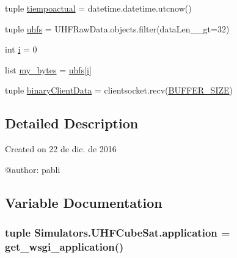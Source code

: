 \begin{DoxyCompactItemize}
\item 
tuple \hyperlink{namespace_simulators_1_1_u_h_f_cube_sat_a7fb0f7569e31bfb48df74cb2df1e8982}{tiempoactual} = datetime.\+datetime.\+utcnow()
\item 
tuple \hyperlink{namespace_simulators_1_1_u_h_f_cube_sat_a37d8eb275fb0a949c06d80bea0726bcf}{uhfs} = U\+H\+F\+Raw\+Data.\+objects.\+filter(data\+Len\+\_\+\+\_\+gt=32)
\item 
int \hyperlink{namespace_simulators_1_1_u_h_f_cube_sat_a58cd206e7df089544d2a4c9ed6e0396b}{i} = 0
\item 
list \hyperlink{namespace_simulators_1_1_u_h_f_cube_sat_a6103aa3fd4ff07b067933dfecee3c073}{my\+\_\+bytes} = \hyperlink{namespace_simulators_1_1_u_h_f_cube_sat_a37d8eb275fb0a949c06d80bea0726bcf}{uhfs}\mbox{[}\hyperlink{namespace_simulators_1_1_u_h_f_cube_sat_a58cd206e7df089544d2a4c9ed6e0396b}{i}\mbox{]}
\item 
tuple \hyperlink{namespace_simulators_1_1_u_h_f_cube_sat_a042020fd8890c418f595709d37cbfa94}{binary\+Client\+Data} = clientsocket.\+recv(\hyperlink{namespace_simulators_1_1_u_h_f_cube_sat_a77fb75361e519e64f660c4da5cca3a8d}{B\+U\+F\+F\+E\+R\+\_\+\+S\+I\+Z\+E})
\end{DoxyCompactItemize}


\subsection{Detailed Description}
\begin{DoxyVerb}Created on 22 de dic. de 2016

@author: pabli
\end{DoxyVerb}
 

\subsection{Variable Documentation}
\hypertarget{namespace_simulators_1_1_u_h_f_cube_sat_adc9e972abbe8f23136884aa756f61bb4}{}
\subsubsection[{application}]{\setlength{\rightskip}{0pt plus 5cm}tuple Simulators.\+U\+H\+F\+Cube\+Sat.\+application = get\+\_\+wsgi\+\_\+application()}\label{namespace_simulators_1_1_u_h_f_cube_sat_adc9e972abbe8f23136884aa756f61bb4}


